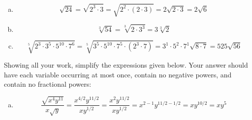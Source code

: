 \documentclass[12pt,letterpaper]{exam}
\begin{document}
\begin{questions}
 \pspace

\sol
\begin{enumerate}[(a)]
\item 
	\[
	\sqrt{24}= \sqrt{2^3 \cdot 3}= \sqrt{2^2 \cdot (2 \cdot 3)}= 2 \sqrt{2 \cdot 3}= 2 \sqrt{6}
	\] \pspace

\item 
	\[
	\sqrt[3]{54}= \sqrt[3]{2 \cdot 3^3}= 3 \sqrt[3]{2}
	\] \pspace

\item 
	\[
	\sqrt[5]{2^3 \cdot 3^5 \cdot 5^{10} \cdot 7^6}= \sqrt[5]{3^5 \cdot 5^{10} \cdot 7^5 \cdot (2^3 \cdot 7)}= 3^1 \cdot 5^2 \cdot 7^1 \sqrt{8 \cdot 7}= 525 \sqrt{56}
	\]
\end{enumerate}



\newpage
\question Showing all your work, simplify the expressions given below. Your answer should have each variable occurring at most once, contain no negative powers, and contain no fractional powers:
	 \pspace

\sol
\begin{enumerate}[(a)]
\item 
	\[
	\dfrac{\sqrt{x^4 y^{11}}}{x \sqrt{y}}= \dfrac{x^{4/2} y^{11/2}}{x y^{1/2}}= \dfrac{x^2 y^{11/2}}{x y^{1/2}}= x^{2-1} y^{11/2 - 1/2}= x y^{10/2}= x y^5
	\] \pspace


\end{enumerate}
\end{questions}
\end{document}
